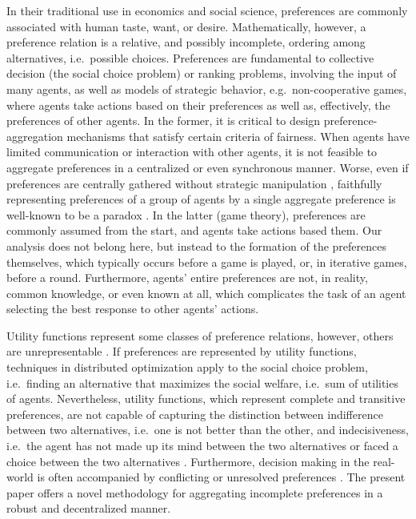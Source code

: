 \documentclass[conference]{ieeeconf}
\begin{document}
In their traditional use in economics and social science, preferences are commonly associated with human taste, want, or desire. Mathematically, however, a preference relation is a relative, and possibly incomplete, ordering among alternatives, i.e.~possible choices. Preferences are fundamental to collective decision (the social choice problem) or ranking problems, involving the input of many agents, as well as models of strategic behavior, e.g.~non-cooperative games, where agents take actions based on their preferences as well as, effectively, the preferences of other agents. In the former, it is critical to design preference-aggregation mechanisms that satisfy certain criteria of fairness. When agents have limited communication or interaction with other agents, it is not feasible to aggregate preferences in a centralized or even synchronous manner. Worse, even if preferences are centrally gathered without strategic manipulation \cite{gibbard1973,satterthwaite1975}, faithfully representing preferences of a group of agents by a single aggregate preference is well-known to be a paradox \cite{arrow2012}. In the latter (game theory), preferences are commonly assumed from the start, and agents take actions based them. Our analysis does not belong here, but instead to the formation of the preferences themselves, which typically occurs before a game is played, or, in iterative games, before a round. Furthermore, agents' entire preferences are not, in reality, common knowledge, or even known at all, which complicates the task of an agent selecting the best response to other agents' actions.

Utility functions represent some classes of preference relations, however, others are unrepresentable \cite{Beardon2002}. If preferences are represented by utility functions, techniques in distributed optimization apply to the social choice problem, i.e.~finding an alternative that maximizes the social welfare, i.e.~sum of utilities of agents. Nevertheless, utility functions, which represent complete and transitive preferences, are not capable of capturing the distinction between indifference between two alternatives, i.e.~one is not better than the other, and indecisiveness, i.e.~the agent has not made up its mind between the two alternatives or faced a choice between the two alternatives \cite{eliaz2006}. Furthermore, decision making in the real-world is often accompanied by conflicting or unresolved preferences \cite{levi1990}. The present paper offers a novel methodology for aggregating incomplete preferences in a robust and decentralized manner.
\end{document}
